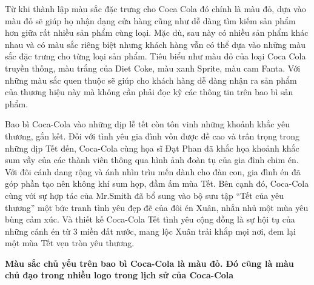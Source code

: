 \documentclass{article}
\begin{document}
\begin{itemize}
        \qquad Từ khi thành lập màu sắc đặc trưng cho Coca Cola đó chính là màu đỏ, dựa vào màu đỏ sẽ giúp họ nhận dạng cửa hàng cũng như dễ dàng tìm kiếm sản phẩm hơn giữa rất nhiều sản phẩm cùng loại. Mặc dù, sau này có nhiều sản phẩm khác nhau và có màu sắc riêng biệt nhưng khách hàng vẫn có thể dựa vào những màu sắc đặc trưng cho từng loại sản phẩm. Tiêu biểu như màu đỏ của loại Coca Cola truyền thống, màu trắng của Diet Coke, màu xanh Sprite, màu cam Fanta. Với những màu sắc quen thuộc sẽ giúp cho khách hàng dễ dàng nhận ra sản phẩm của thương hiệu này mà không cần phải đọc kỹ các thông tin trên bao bì sản phẩm.

        \qquad Bao bì Coca-Cola vào những dịp lễ tết còn tôn vinh những khoảnh khắc yêu thương, gắn kết. Đối với tình yêu gia đình vốn được đề cao và trân trọng trong những dịp Tết đến, Coca-Cola cùng họa sĩ Đạt Phan đã khắc họa khoảnh khắc sum vầy của các thành viên thông qua hình ảnh đoàn tụ của gia đình chim én. Với đôi cánh dang rộng và ánh nhìn trìu mến dành cho đàn con, gia đình én đã góp phần tạo nên không khí sum họp, đầm ấm mùa Tết. Bên cạnh đó, Coca-Cola cùng với sự hợp tác của Mr.Smith đã bổ sung vào bộ sưu tập “Tết của yêu thương” một bức tranh tình yêu đẹp đẽ của đôi én Xuân, nhắn nhủ một mùa yêu bùng cảm xúc. Và thiết kế Coca-Cola Tết tình yêu cộng đồng là sự hội tụ của những cánh én từ 3 miền đất nước, mang lộc Xuân trải khắp mọi nơi, đem lại một mùa Tết vẹn tròn yêu thương.

        \qquad \textbf{Màu sắc chủ yếu trên bao bì Coca-Cola là màu đỏ. Đó cũng là màu chủ đạo trong nhiều logo trong lịch sử của Coca-Cola}


\end{itemize}
\end{document}
